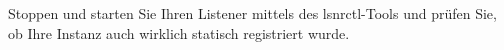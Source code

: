     \item Stoppen und starten Sie Ihren Listener mittels des lsnrctl-Tools und pr\"ufen Sie, ob Ihre Instanz auch wirklich statisch registriert wurde.
